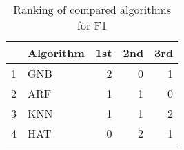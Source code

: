 \begin{table}
\footnotesize
\caption{Ranking of compared algorithms for F1}
\label{tab:places F1}
\begin{tabular}{llrrr}
\hline
 & Algorithm & 1st & 2nd & 3rd \\
\hline
1 & GNB & 2 & 0 & 1 \\
2 & ARF & 1 & 1 & 0 \\
3 & KNN & 1 & 1 & 2 \\
4 & HAT & 0 & 2 & 1 \\
\hline
\end{tabular}
\end{table}

